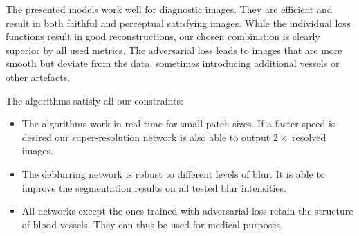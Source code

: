 \documentclass{scrartcl}
\begin{document}
The presented models work well for diagnostic images.
They are efficient and result in both faithful and perceptual satisfying images.
While the individual loss functions result in good reconstructions, our chosen combination is clearly superior by all used metrics.
The adversarial loss leads to images that are more smooth but deviate from the data, sometimes introducing additional vessels or other artefacts.

The algorithms satisfy all our constraints:
\begin{itemize}
\item The algorithms work in real-time for small patch sizes.
  If a faster speed is desired our super-resolution network is also able to output $2\times$ resolved images.
\item The deblurring network is robust to different levels of blur.
  It is able to improve the segmentation results on all tested blur intensities.
\item All networks except the ones trained with adversarial loss retain the structure of blood vessels.
  They can thus be used for medical purposes.
\end{itemize}


\printbibliography
\end{document}
